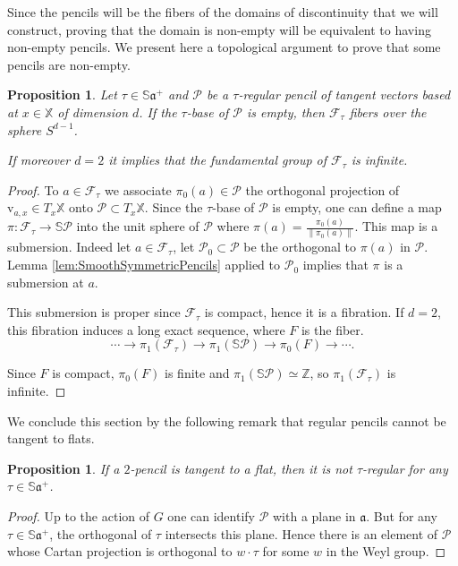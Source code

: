 \documentclass[reqno,10pt]{amsart}
\theoremstyle{plain}
\newtheorem{prop}[thm]{Proposition}
\theoremstyle{definition}
\theoremstyle{remark}
\newcommand{\type}{\tau}
\newcommand{\Sph}{\mathbb{S}}
\newcommand{\X}{\mathbb{X}}
\begin{document}
Since the pencils will be the fibers of the domains of discontinuity that we will construct, proving that the domain is non-empty will be equivalent to having non-empty pencils. We present here a topological argument to prove that some pencils are non-empty.

\begin{prop}
\label{prop:NonEmptyPencils}
Let $\type\in \Sph\mathfrak{a}^+$ and $\mathcal{P}$ be a $\type$-regular pencil of tangent vectors based at $x\in \X$ of dimension $d$. If the $\type$-base of $\mathcal{P}$ is empty, then $\mathcal{F}_\tau$ fibers over the sphere $S^{d-1}$.

 If moreover $d=2$ it implies that the fundamental group of $\mathcal{F}_\type$ is infinite.
\end{prop}

\begin{proof}
To $a\in \mathcal{F}_\type$ we associate $\pi_0(a)\in \mathcal{P}$ the orthogonal projection of $\mathrm{v}_{a,x}\in T_x\X$ onto $\mathcal{P}\subset T_x\X$. Since the $\type$-base of $\mathcal{P}$ is empty, one can define a map $\pi:\mathcal{F}_\type\to \Sph\mathcal{P}$ into the unit sphere of $\mathcal{P}$ where $\pi(a)=\frac{\pi_0(a)}{\lVert\pi_0(a)\rVert}$. This map is a submersion. Indeed let $a\in \mathcal{F}_\type$, let $\mathcal{P}_0\subset \mathcal{P}$ be the orthogonal to $\pi(a)$ in $\mathcal{P}$. Lemma \ref{lem:SmoothSymmetricPencils} applied to $\mathcal{P}_0$ implies that $\pi$ is a submersion at $a$.

\medskip

This submersion is proper since $\mathcal{F}_\type$ is compact, hence it is a fibration.
If $d=2$, this fibration induces a long exact sequence, where $F$ is the fiber.
$$\cdots \to \pi_1\left(\mathcal{F}_\type\right) \to \pi_1\left(\Sph\mathcal{P}\right)\to \pi_0\left(F\right)\to \cdots.$$

Since $F$ is compact,  $\pi_0\left(F\right)$ is finite and $\pi_1\left(\Sph\mathcal{P}\right)\simeq \mathbb{Z}$, so $\pi_1\left(\mathcal{F}_\type\right)$ is infinite.

\end{proof}

We conclude this section by the following remark that regular pencils cannot be tangent to flats.

\begin{prop}
\label{prop:Rank2}
If a $2$-pencil is tangent to a flat, then it is not $\type$-regular for any $\type\in \Sph\mathfrak{a}^+$. 
\end{prop}
\begin{proof}
Up to the action of $G$ one can identify $\mathcal{P}$ with a plane in $\mathfrak{a}$. But  for any $\type\in \Sph\mathfrak{a}^+$, the orthogonal of $\type$ intersects this plane. Hence there is an element of $\mathcal{P}$ whose Cartan projection is orthogonal to $w\cdot \type$ for some $w$ in the Weyl group.
\end{proof}
\end{document}
